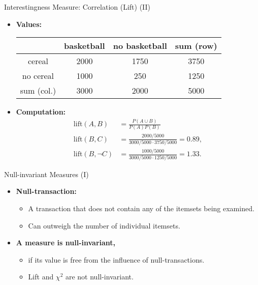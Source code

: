 \begin{frame}{Interestingness Measure: Correlation (Lift) (II)}
	\begin{itemize}
		\item \textbf{Values:} \\
		      \begin{center}
			      \begin{tabular}{|c|c|c|c|}
				      \hline
				                 & basketball & no basketball & sum (row) \\\hline
				      cereal     & 2000       & 1750          & 3750      \\\hline
				      no cereal  & 1000       & 250           & 1250      \\\hline
				      sum (col.) & 3000       & 2000          & 5000      \\\hline
			      \end{tabular}
		      \end{center}
		\item \textbf{Computation:} \\
		      \begin{align*}
			      \text{lift}(A,B)      & = \frac{P(A \cup B)}{P(A) P(B)}                            \\
			      \text{lift}(B,C)      & = \frac{2000/5000}{3000/5000 \cdot 3750 / 5000} = 0.89,    \\
			      \text{lift}(B,\neg C) & = \frac{1000 / 5000}{3000 / 5000 \cdot 1250 / 5000} =1.33.
		      \end{align*}
	\end{itemize}
\end{frame}


\begin{frame}{Null-invariant Measures (I)}
	\begin{itemize}
		\item \textbf{\color{airforceblue}Null-transaction:}
		      \begin{itemize}
			      \item A transaction that does not contain any of the
			            itemsets being examined.
			      \item Can outweigh the number of individual itemsets.
		      \end{itemize}
		\item \textbf{\color{airforceblue}A measure is null-invariant,}
		      \begin{itemize}
			      \item if its value is free from the influence of
			            null-transactions.
			      \item Lift and $\chi^2$ are not null-invariant.
		      \end{itemize}
	\end{itemize}
\end{frame}

